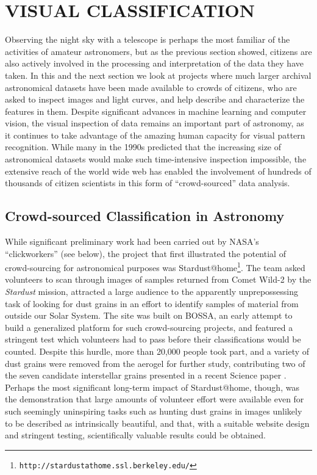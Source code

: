 \documentclass{ar2e}
\def\CaseStudy#1{\noindent{\it\bf #1 \,\,\,\,}}
\def\url#1{\texttt{#1}}
\begin{document}

\section{VISUAL CLASSIFICATION}
\label{sec:class}

Observing the night sky with a telescope is perhaps the most familiar of the
activities of amateur astronomers, but as the previous section showed, citizens
are also actively involved in the processing and interpretation of the data they
have taken.  In this and the next section we look at projects where much larger
archival astronomical datasets have been made available to crowds of citizens,
who are asked to inspect images and light curves, and help describe and
characterize the features in them. Despite significant advances in machine
learning and computer vision, the visual inspection of data remains an important
part of astronomy, as it continues to take advantage of the amazing human
capacity for visual pattern recognition. While many in the 1990s predicted that
the increasing size of astronomical datasets would make such time-intensive
inspection impossible, the extensive reach of the world wide web has enabled the
involvement of hundreds of thousands of citizen scientists in this form of
``crowd-sourced'' data analysis. 


\subsection{Crowd-sourced Classification in Astronomy}
\label{sec:class:astro}

\CaseStudy{Stardust@home.}
While significant preliminary work had been carried out by NASA's
``clickworkers'' (see below), the project that first illustrated the potential
of crowd-sourcing for astronomical purposes was 
Stardust@home\footnote{\url{http://stardustathome.ssl.berkeley.edu/}}. The team
asked volunteers to scan through images of samples returned from Comet Wild-2 by
the \textit{Stardust} mission, attracted a large audience to the apparently
unprepossessing task of looking for dust grains in an effort to identify samples
of material from outside our Solar System. The site was built on BOSSA, an early
attempt to build a generalized platform for such crowd-sourcing projects, and
featured a stringent test which volunteers had to pass before their
classifications would be counted. Despite this hurdle, more than 20,000 people
took part, and a variety of dust grains were removed from the aerogel for
further study, contributing two of the seven candidate interstellar grains
presented in a recent Science paper \citep{Westphal}. Perhaps the most
significant long-term impact of Stardust@home, though, was the demonstration
that large amounts of volunteer effort were available even for such seemingly
uninspiring tasks such as hunting dust grains in images unlikely to be described
as intrinsically beautiful, and that, with a suitable website design and
stringent testing, scientifically valuable results could be obtained. 
\end{document}

